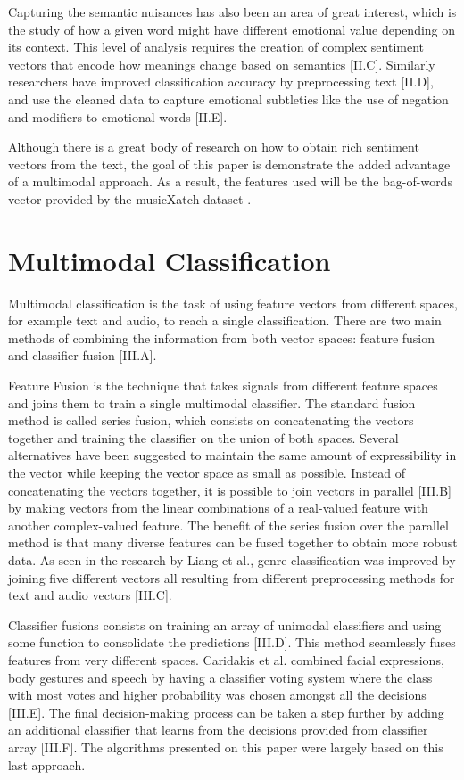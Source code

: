 Capturing the semantic nuisances has also been an area of great interest, which is 
the study of how a given word might have different emotional value depending on its 
context. This level of analysis requires the creation of complex sentiment vectors 
that encode how meanings change based on semantics [II.C].  Similarly researchers 
have improved classification accuracy by preprocessing text [II.D], and use the 
cleaned data to capture emotional subtleties like the use of negation and modifiers 
to emotional words [II.E]. 

Although there is a great body of research on how to obtain rich sentiment vectors 
from the text, the goal of this paper is demonstrate the added advantage of a 
multimodal approach. As a result, the features used will be the bag-of-words vector 
provided by the musicXatch dataset \cite{musicXmatchDataset}.

\section{Multimodal Classification}

Multimodal classification is the task of using feature vectors from different spaces, 
for example text and audio, to reach a single classification. There are two main 
methods of combining the information from both vector spaces: feature fusion and 
classifier fusion [III.A]. 

Feature Fusion is the technique that takes signals from different 
feature spaces and joins them to train a single multimodal classifier. The standard 
fusion method is called series fusion, which consists on concatenating the vectors 
together and training the classifier on the union of both spaces. Several alternatives 
have been suggested to maintain the same amount of expressibility in the vector while 
keeping the vector space as small as possible. Instead of concatenating the vectors 
together, it is possible to join vectors in parallel [III.B] by making vectors from the linear
combinations of a real-valued feature with another complex-valued feature. The benefit 
of the series fusion over the parallel method is that many diverse features can be fused
together to obtain more robust data. As seen in the research by Liang et al., 
genre classification was improved by joining five different vectors all resulting from 
different preprocessing methods for text and audio vectors [III.C]. 

Classifier fusions consists on training an array of unimodal classifiers and using some 
function to consolidate the predictions [III.D]. This method seamlessly fuses features 
from very different spaces. Caridakis et al. combined facial expressions, body gestures 
and speech by having a classifier voting system where the class with most votes and 
higher probability was chosen amongst all the decisions [III.E]. The final decision-making 
process can be taken a step further by adding an additional classifier that learns from 
the decisions provided from classifier array [III.F].  The algorithms presented on this 
paper were largely based on this last approach. 



